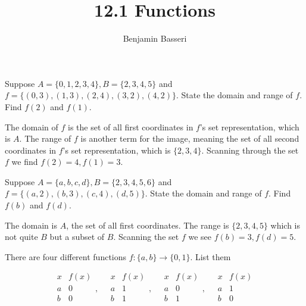 \documentclass{article}
\title{12.1 Functions}
\author{Benjamin Basseri}
\begin{document}
\maketitle

\begin{problem}
Suppose $A = \{0, 1, 2, 3, 4\}, B = \{2, 3, 4, 5\}$ and $f = \{(0, 3), (1, 3), (2, 4), (3, 2), (4, 2)\}$. State the domain and range of $f$. Find $f(2)$ and $f(1)$.
\end{problem}

The domain of $f$ is the set of all first coordinates in $f$'s set representation, which is $A$. The range of $f$ is another term for the image, meaning the set of all second coordinates in $f$'s set representation, which is $\{2, 3, 4\}$. Scanning through the set $f$ we find $f(2) = 4, f(1) = 3$.

\begin{problem}
Suppose $A = \{a, b, c, d\}, B = \{2, 3, 4, 5, 6\}$ and $f = \{(a, 2), (b, 3), (c, 4), (d, 5)\}$. State the domain and range of $f$. Find $f(b)$ and $f(d)$.
\end{problem}

The domain is $A$, the set of all first coordinates. The range is $\{2, 3, 4, 5\}$ which is not quite $B$ but a subset of $B$. Scanning the set $f$ we see $f(b) = 3, f(d) = 5$.

\begin{problem}
There are four different functions $f: \{a, b\} \to \{0, 1\}$. List them
\end{problem}
$$\begin{array}{c|c}
    x & f(x) \\
    \hline
    a & 0    \\
    b & 0    \\
  \end{array}, \quad
  \begin{array}{c|c}
    x & f(x) \\
    \hline
    a & 1    \\
    b & 1    \\
  \end{array}, \quad
  \begin{array}{c|c}
    x & f(x) \\
    \hline
    a & 0    \\
    b & 1    \\
  \end{array}, \quad
  \begin{array}{c|c}
    x & f(x) \\
    \hline
    a & 1    \\
    b & 0    \\
  \end{array}
$$
\end{document}

